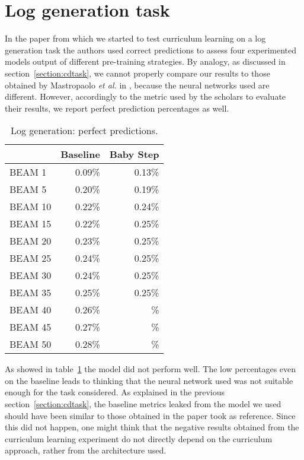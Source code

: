 \section{Log generation task}
In the paper from which we started to test curriculum learning on a log generation task the authors used
correct predictions to assess four experimented models output of different pre-training strategies. 
By analogy, as discussed in section~\ref{section:cdtask}, we cannot properly compare our results to those 
obtained by Mastropaolo \textit{et al.} in \cite{Mastropaolo2022}, because the neural networks used are different.
However, accordingly to the metric used by the scholars to evaluate their results, we report perfect prediction percentages as well.
\begin{table}[h!]
    \centering
    \begin{tabular}{l|r|r} 
    & Baseline & Baby Step\\ [0.5ex] 
    \hline
    BEAM 1 & 0.09\% &  0.13\%\\  
    BEAM 5 &  0.20\% &  0.19\% \\ 
    BEAM 10 &  0.22\% &  0.24\%\\
    BEAM 15 &  0.22\% &  0.25\%\\
    BEAM 20 &  0.23\% &  0.25\%\\
    BEAM 25 &  0.24\% &  0.25\%\\
    BEAM 30 &  0.24\% &  0.25\%\\
    BEAM 35 &  0.25\% &  0.25\%\\
    BEAM 40 &  0.26\% &  \%\\
    BEAM 45 &  0.27\%& \%\\
    BEAM 50 &  0.28\%& \%\\ [1ex]
    \end{tabular}
    \caption{Log generation: perfect predictions.}
    \label{table:3}
\end{table}
As showed in table~\ref{table:3} the model did not perform well. The low percentages even on the baseline
leads to thinking that the neural network used was not suitable enough for the task considered. 
As explained in the previous section~\ref{section:cdtask}, the baseline metrics leaked from the model we used
should have been similar to those obtained in the paper took as reference. Since this did not happen,
one might think that the negative results obtained from the curriculum learning experiment do not directly 
depend on the curriculum approach, rather from the architecture used.

